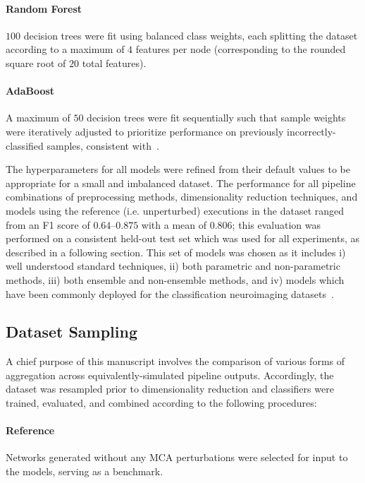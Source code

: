 \documentclass[10pt]{SelfArx} %
\begin{document}
\paragraph{Random Forest} $100$ decision trees were fit using balanced class weights, each splitting the dataset
according to a maximum of $4$ features per node (corresponding to the rounded square root of $20$ total features).

\paragraph{AdaBoost} A maximum of $50$ decision trees were fit sequentially such that sample weights were iteratively
adjusted to prioritize performance on previously incorrectly-classified samples, consistent with~\cite{Freund1997-qy}.

The hyperparameters for all models were refined from their default values to be appropriate for a small and imbalanced
dataset. The performance for all pipeline combinations of preprocessing methods, dimensionality reduction techniques,
and models using the reference (i.e. unperturbed) executions in the dataset ranged from an F1 score of $0.64 – 0.875$
with a mean of $0.806$; this evaluation was performed on a consistent held-out test set which was used for all
experiments, as described in a following section. This set of models was chosen as it includes i) well understood
standard techniques, ii) both parametric and non-parametric methods, iii) both ensemble and non-ensemble
methods, and iv) models which have been commonly deployed for the classification neuroimaging
datasets~\cite{Meier2012-ve,Tunc2016-cz, Zhu2018-cs,Payabvash2019-tm,Crossley2014-tg,Park2015-uj,Nayak2016-wl,Tolan2018-nq}.

\subsection*{Dataset Sampling}

A chief purpose of this manuscript involves the comparison of various forms of aggregation across
equivalently-simulated pipeline outputs. Accordingly, the dataset was resampled prior to dimensionality reduction and
classifiers were trained, evaluated, and combined according to the following procedures:

\paragraph{Reference} Networks generated without any MCA perturbations were selected for input to the models, serving
as a benchmark.
\end{document}
